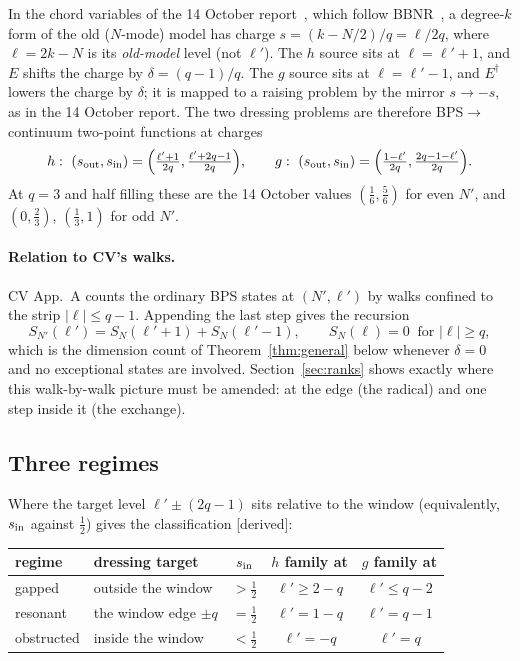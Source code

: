 \documentclass[11pt]{article}
\newcommand{\Np}{N'}
\newcommand{\lp}{\ell'}
\newcommand{\tagbox}[2]{\textsf{\small\color{#1}[#2]}}
\newcommand{\DER}{\tagbox{cder}{derived}}
\theoremstyle{plain}
\theoremstyle{remark}
\numberwithin{equation}{section}
\begin{document}
In the chord variables of the 14 October report~\cite{prog1014}, which follow BBNR~\cite{BBNR}, a degree-$k$ form of
the old ($N$-mode) model has charge $s=(k-N/2)/q=\ell/2q$, where $\ell=2k-N$ is its \emph{old-model} level (not $\lp$).
The $h$ source sits at $\ell=\lp+1$, and $E$ shifts the charge by $\delta=(q-1)/q$. The $g$ source sits at $\ell=\lp-1$, and
$E^\dagger$ lowers the charge by $\delta$; it is mapped to a raising problem by the mirror $s\to-s$, as in the 14 October
report. The two dressing problems are therefore BPS$\to$continuum two-point functions at charges
\begin{equation}\label{eq:charges}
h:\ (s_{\rm out},s_{\rm in})=\Big(\tfrac{\lp+1}{2q},\tfrac{\lp+2q-1}{2q}\Big),\qquad
g:\ (s_{\rm out},s_{\rm in})=\Big(\tfrac{1-\lp}{2q},\tfrac{2q-1-\lp}{2q}\Big).
\end{equation}
At $q=3$ and half filling these are the 14 October values $(\tfrac16,\tfrac56)$ for even $\Np$, and $(0,\tfrac23)$,
$(\tfrac13,1)$ for odd $\Np$.

\paragraph{Relation to CV's walks.} CV App.~A counts the ordinary BPS states at $(\Np,\lp)$ by walks confined to the
strip $|\ell|\le q-1$. Appending the last step gives the recursion
\begin{equation}
S_{\Np}(\lp)=S_N(\lp+1)+S_N(\lp-1),\qquad S_N(\ell)=0\ \text{ for }|\ell|\ge q,
\end{equation}
which is the dimension count of Theorem~\ref{thm:general} below whenever $\delta=0$ and no exceptional states are
involved. Section~\ref{sec:ranks} shows exactly where this walk-by-walk picture must be amended: at the edge (the
radical) and one step inside it (the exchange).

\subsection{Three regimes}
Where the target level $\lp\pm(2q-1)$ sits relative to the window (equivalently, $s_{\rm in}$ against $\tfrac12$) gives
the classification \DER:

\begin{center}\small
\begin{tabular}{llccc}
\toprule
regime & dressing target & $s_{\rm in}$ & $h$ family at & $g$ family at\\
\midrule
gapped & outside the window & $>\tfrac12$ & $\lp\ge2-q$ & $\lp\le q-2$\\
resonant & the window edge $\pm q$ & $=\tfrac12$ & $\lp=1-q$ & $\lp=q-1$\\
obstructed & inside the window & $<\tfrac12$ & $\lp=-q$ & $\lp=q$\\
\bottomrule
\end{tabular}
\end{center}
\end{document}
